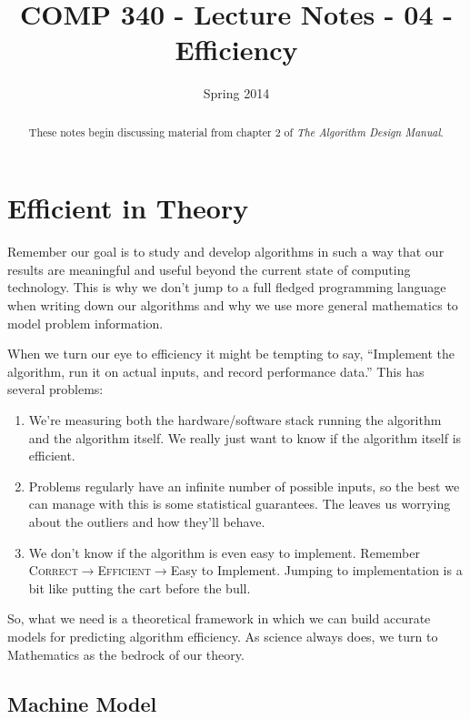 \documentclass[]{tufte-handout}
\title{COMP 340 - Lecture Notes - 04 - Efficiency}
\date{Spring 2014}
\begin{document}
\maketitle

\begin{abstract}
These notes begin discussing material from chapter 2 of \textit{The Algorithm Design Manual}. 
\end{abstract}

\section{Efficient in Theory}

Remember our goal is to study and develop algorithms in such a way that our results are meaningful and useful beyond the current state of computing technology. This is why we don't jump to a full fledged programming language when writing down our algorithms and why we use more general mathematics to model problem information.  

When we turn our eye to efficiency it might be tempting to say, ``Implement the algorithm, run it on actual inputs, and record performance data.'' This has several problems:
\begin{enumerate}
\item We're measuring both the hardware/software stack running the algorithm and the algorithm itself.  We really just want to know if the algorithm itself is efficient.
\item Problems regularly have an infinite number of possible inputs, so the best we can manage with this is some statistical guarantees.  The leaves us worrying about the outliers and how they'll behave.
\item We don't know if the algorithm is even easy to implement. Remember \textsc{Correct}$\rightarrow$\textsc{Efficient}$\rightarrow${Easy to Implement}. Jumping to implementation is a bit like putting the cart before the bull. 
\end{enumerate} 
So, what we need is a theoretical framework in which we can build accurate models for predicting algorithm efficiency. As science always does, we turn to Mathematics as the bedrock of our theory. 

\subsection{Machine Model}
\end{document}
